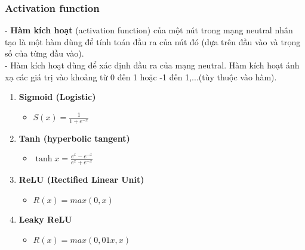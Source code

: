 \documentclass{beamer}
\begin{document}
\begin{frame}
\frametitle{Activation function}

- \textbf{Hàm kích hoạt} (activation function) của một nút trong mạng neutral nhân tạo là một hàm dùng để tính toán đầu ra của nút đó (dựa trên đầu vào và trọng số của từng đầu vào).
\\- Hàm kích hoạt dùng để xác định đầu ra của mạng neutral. Hàm kích hoạt ánh xạ các giá trị vào khoảng từ 0 đến 1 hoặc -1 đến 1,...(tùy thuộc vào hàm).

\begin{enumerate}
    \item \textbf{Sigmoid (Logistic)}
    \begin{itemize}
        \item 
        \begin{center}
        \large $S(x)=\frac{1}{1+e^{-x}}$
        \end{center}
    \end{itemize}
    
    \item \textbf{Tanh (hyperbolic tangent)}
    \begin{itemize}
        \item 
        \begin{center}
        \large $\tanh x = \frac{e^{x}-e^{-x}}{e^{x}+e^{-x}}$
        \end{center}
    \end{itemize}
    
    \item \textbf{ReLU (Rectified Linear Unit)}
    \begin{itemize}
        \item 
        \begin{center}
        \large $R(x) = max(0,x)$
        \end{center}
    \end{itemize}
    
    \item \textbf{Leaky ReLU}
    \begin{itemize}
        \item 
        \begin{center}
        \large $R(x) = max(0,01x,x)$
        \end{center}
    \end{itemize}
    
\end{enumerate}
\end{frame}
\end{document}
